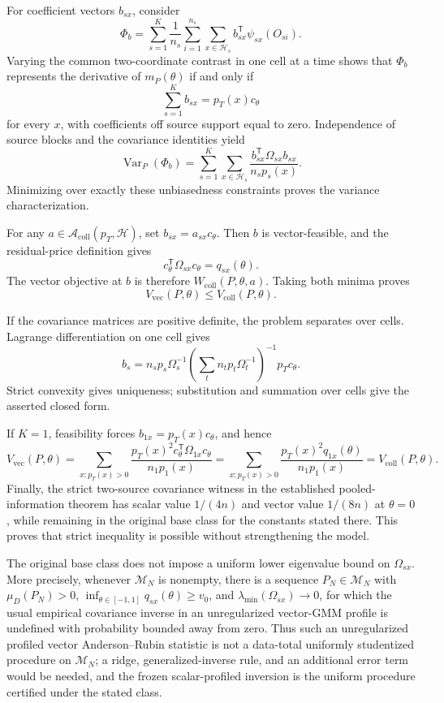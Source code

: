 For coefficient vectors \(b_{sx}\), consider
\[
\Phi_b=\sum_{s=1}^K\frac1{n_s}\sum_{i=1}^{n_s}
\sum_{x\in\mathcal H_s}b_{sx}^{\mathsf T}\psi_{sx}(O_{si}).
\]
Varying the common two-coordinate contrast in one cell at a time shows that \(\Phi_b\) represents the derivative of \(m_P(\theta)\) if and only if
\[
\sum_{s=1}^K b_{sx}=p_T(x)c_\theta
\]
for every \(x\), with coefficients off source support equal to zero. Independence of source blocks and the covariance identities yield
\[
\operatorname{Var}_P(\Phi_b)
=\sum_{s=1}^K\sum_{x\in\mathcal H_s}
\frac{b_{sx}^{\mathsf T}\Omega_{sx}b_{sx}}{n_sp_s(x)}.
\]
Minimizing over exactly these unbiasedness constraints proves the variance characterization.

For any \(a\in\mathcal A_{\mathrm{coll}}(p_T,\mathcal H)\), set \(b_{sx}=a_{sx}c_\theta\). Then \(b\) is vector-feasible, and the residual-price definition gives
\[
c_\theta^{\mathsf T}\Omega_{sx}c_\theta=q_{sx}(\theta).
\]
The vector objective at \(b\) is therefore \(W_{\mathrm{coll}}(P,\theta,a)\). Taking both minima proves
\[
V_{\mathrm{vec}}(P,\theta)\le V_{\mathrm{coll}}(P,\theta).
\]

If the covariance matrices are positive definite, the problem separates over cells. Lagrange differentiation on one cell gives
\[
b_s=n_sp_s\Omega_s^{-1}
\left(\sum_t n_tp_t\Omega_t^{-1}\right)^{-1}p_Tc_\theta.
\]
Strict convexity gives uniqueness; substitution and summation over cells give the asserted closed form.

If \(K=1\), feasibility forces \(b_{1x}=p_T(x)c_\theta\), and hence
\[
V_{\mathrm{vec}}(P,\theta)
=\sum_{x:p_T(x)>0}\frac{p_T(x)^2c_\theta^{\mathsf T}\Omega_{1x}c_\theta}{n_1p_1(x)}
=\sum_{x:p_T(x)>0}\frac{p_T(x)^2q_{1x}(\theta)}{n_1p_1(x)}
=V_{\mathrm{coll}}(P,\theta).
\]
Finally, the strict two-source covariance witness in the established pooled-information theorem has scalar value \(1/(4n)\) and vector value \(1/(8n)\) at \(\theta=0\), while remaining in the original base class for the constants stated there. This proves that strict inequality is possible without strengthening the model.

The original base class does not impose a uniform lower eigenvalue bound on \(\Omega_{sx}\). More precisely, whenever \(\mathcal M_N\) is nonempty, there is a sequence \(P_N\in\mathcal M_N\) with \(\mu_D(P_N)>0\), \(\inf_{\theta\in[-1,1]}q_{sx}(\theta)\ge v_0\), and \(\lambda_{\min}(\Omega_{sx})\to0\), for which the usual empirical covariance inverse in an unregularized vector-GMM profile is undefined with probability bounded away from zero. Thus such an unregularized profiled vector Anderson--Rubin statistic is not a data-total uniformly studentized procedure on \(\mathcal M_N\); a ridge, generalized-inverse rule, and an additional error term would be needed, and the frozen scalar-profiled inversion is the uniform procedure certified under the stated class.

